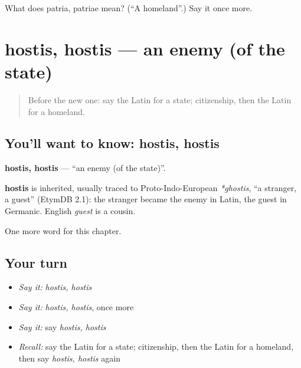 \begin{tcolorbox}[breakable,colback=teal!4,colframe=teal!35!black,title={Before you move on}]
What does patria, patriae mean? (\textquotedblleft{}A homeland\textquotedblright{}.) Say it once more.
\end{tcolorbox}
\section[hostis, hostis]{hostis, hostis — an enemy (of the state)}

\label{lesson:LA-C271-hostis}



\begin{quote}
Before the new one: say the Latin for a state; citizenship, then the Latin for a homeland.
\end{quote}

\subsection*{You'll want to know: hostis, hostis}
\textbf{hostis, hostis} — \textquotedblleft{}an enemy (of the state)\textquotedblright{}.

\begin{cousinweb}
\textbf{hostis} is inherited, usually traced to Proto-Indo-European \emph{*ghostis}, \textquotedblleft{}a stranger, a guest\textquotedblright{} (EtymDB 2.1): the stranger became the enemy in Latin, the guest in Germanic. English \emph{guest} is a cousin.
\end{cousinweb}

\begin{grammarlens}[title={What you've built}]
One more word for this chapter.
\end{grammarlens}

\subsection*{Your turn}
\begin{itemize}
\raggedright
  \item \emph{Say it:} \emph{hostis, hostis}
  \item \emph{Say it:} \emph{hostis, hostis}, once more
  \item \emph{Say it:} say \emph{hostis, hostis}
  \item \emph{Recall:} say the Latin for a state; citizenship, then the Latin for a homeland, then say \emph{hostis, hostis} again
\end{itemize}

